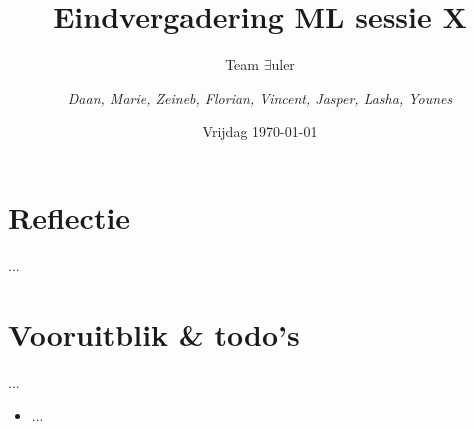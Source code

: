 \documentclass{article}
\title{Eindvergadering ML sessie X}
\author{Team $\exists$uler \and
	\textit{Daan, Marie, Zeineb, Florian, Vincent, Jasper, Lasha, Younes}}
\date{Vrijdag \today}
\begin{document}
	
\maketitle

\section*{Reflectie}

...

\section*{Vooruitblik  \& todo's}

...

\begin{itemize}
	\item ...
\end{itemize}
\end{document}

